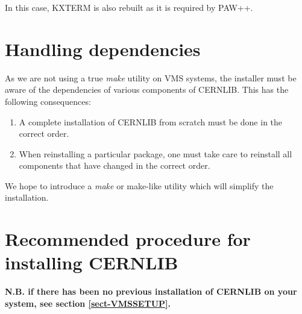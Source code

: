 In this case, KXTERM is also rebuilt as it is required by PAW++.

\section{Handling dependencies}

As we are not using a true {\it make} utility on VMS systems,
the installer must be aware of the dependencies of various
components of CERNLIB. This has the following consequences:

\begin{enumerate}
\item
A complete installation of CERNLIB from scratch must be done
in the correct order.
\item
When reinstalling a particular package, one must take care
to reinstall all components that have changed in the correct
order.
\end{enumerate}

We hope to introduce a {\it make} or make-like utility which
will simplify the installation.

\section{Recommended procedure for installing CERNLIB}

{\bf N.B. if there has been no previous installation of CERNLIB
on your system, see section \ref{sect-VMSSETUP}.}

